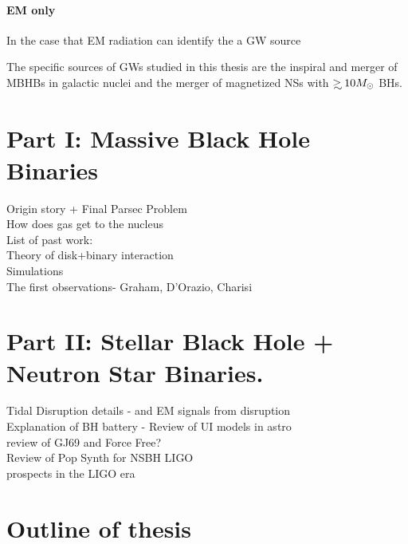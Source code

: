 \paragraph{EM only} In the case that EM radiation can identify the a GW source 

 






The specific sources of GWs studied in this thesis are the inspiral and merger of MBHBs in galactic nuclei and the merger of magnetized NSs with $\gsim 10 \Msun$ BHs.
\section{Part I: Massive Black Hole Binaries}
Origin story + Final Parsec Problem\\

How does gas get to the nucleus\\

List of past work:\\
Theory of disk+binary interaction\\
Simulations\\

The first observations- Graham, D'Orazio, Charisi



\section{Part II: Stellar Black Hole + Neutron Star Binaries.}

Tidal Disruption details - and EM signals from disruption\\

Explanation of BH battery - Review of UI models in astro\\

review of GJ69 and Force Free?\\

Review of Pop Synth for NSBH LIGO\\


prospects in the LIGO era









\section{Outline of thesis}























